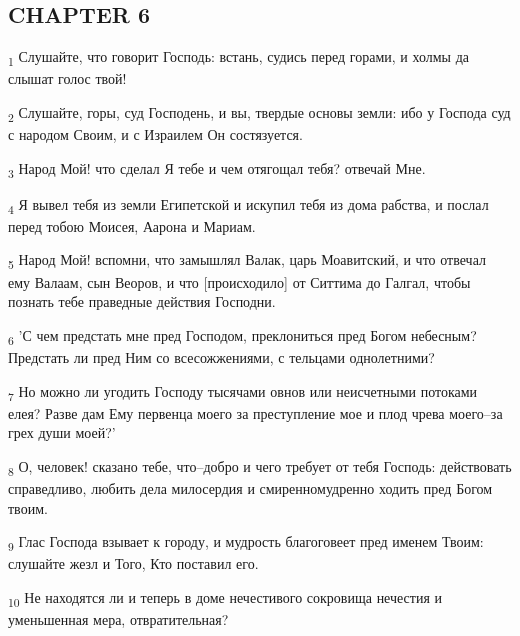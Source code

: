 \subsection{CHAPTER 6}
\begin{tcolorbox}
\textsubscript{1} Слушайте, что говорит Господь: встань, судись перед горами, и холмы да слышат голос твой!
\end{tcolorbox}
\begin{tcolorbox}
\textsubscript{2} Слушайте, горы, суд Господень, и вы, твердые основы земли: ибо у Господа суд с народом Своим, и с Израилем Он состязуется.
\end{tcolorbox}
\begin{tcolorbox}
\textsubscript{3} Народ Мой! что сделал Я тебе и чем отягощал тебя? отвечай Мне.
\end{tcolorbox}
\begin{tcolorbox}
\textsubscript{4} Я вывел тебя из земли Египетской и искупил тебя из дома рабства, и послал перед тобою Моисея, Аарона и Мариам.
\end{tcolorbox}
\begin{tcolorbox}
\textsubscript{5} Народ Мой! вспомни, что замышлял Валак, царь Моавитский, и что отвечал ему Валаам, сын Веоров, и что [происходило] от Ситтима до Галгал, чтобы познать тебе праведные действия Господни.
\end{tcolorbox}
\begin{tcolorbox}
\textsubscript{6} 'С чем предстать мне пред Господом, преклониться пред Богом небесным? Предстать ли пред Ним со всесожжениями, с тельцами однолетними?
\end{tcolorbox}
\begin{tcolorbox}
\textsubscript{7} Но можно ли угодить Господу тысячами овнов или неисчетными потоками елея? Разве дам Ему первенца моего за преступление мое и плод чрева моего--за грех души моей?'
\end{tcolorbox}
\begin{tcolorbox}
\textsubscript{8} О, человек! сказано тебе, что--добро и чего требует от тебя Господь: действовать справедливо, любить дела милосердия и смиренномудренно ходить пред Богом твоим.
\end{tcolorbox}
\begin{tcolorbox}
\textsubscript{9} Глас Господа взывает к городу, и мудрость благоговеет пред именем Твоим: слушайте жезл и Того, Кто поставил его.
\end{tcolorbox}
\begin{tcolorbox}
\textsubscript{10} Не находятся ли и теперь в доме нечестивого сокровища нечестия и уменьшенная мера, отвратительная?
\end{tcolorbox}
